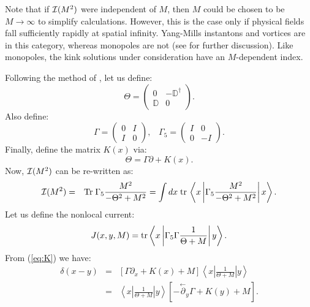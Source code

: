 \documentclass[a4paper,preprint,preprintnumbers,amsmath,amssymb]{revtex4}
\begin{document}
Note that if ${\cal I}(M^2)$ were independent of $M$, then $M$ could be chosen
to be $M \rightarrow \infty$ to simplify calculations. However, this is the 
case only if physical fields fall sufficiently rapidly at spatial infinity. 
Yang-Mills instantons and vortices are in this category, whereas
monopoles are not (see \cite[Appendix A]{ejw79} for further discussion).
Like monopoles, the kink solutions under consideration have an $M$-dependent 
index.

Following the method of \cite{ejw81}, let us define:
\begin{equation}
   \Theta = \left(\begin{array}{cc} 
             0              &  - \mathbb{D}^\dagger \\ 
             \mathbb{D}  &  0 
            \end{array}\right).
\end{equation}
%
Also define:
\begin{equation}
   \Gamma = \left(\begin{array}{cc}
       	     0  &  I \\
       	     I  &  0
            \end{array}\right),
   \;\;\; 
   \Gamma_5 = \left(\begin{array}{cc}
       	     I  &  0 \\
       	     0  &  -I 
            \end{array}\right).
\end{equation}
Finally, define the matrix $K(x)$ via:
\begin{equation}
  \Theta = \Gamma \partial + K(x).
   \label{eq:K}
\end{equation}
%
Now, ${\cal I}(M^2)$ can be re-written as:
\begin{eqnarray}
   {\cal I}(M^2) & = & \hbox{Tr} \; \Gamma_5 \frac{M^2}{-\Theta^2 + M^2}
   = \int dx \; \hbox{tr} \, \left\langle x \left| 
             \Gamma_5 \frac{M^2}{-\Theta^2 + M^2}
                           \right| x \right\rangle .
\end{eqnarray}
%
Let us define the nonlocal current:
\begin{equation}
   J(x,y,M)  =  \hbox{tr} \left\langle x \left| 
             \Gamma_5 \Gamma \frac{1}{\Theta + M}
       	       	       	   \right| y \right\rangle. 
\end{equation}
%
%
From (\ref{eq:K}) we have:
\begin{eqnarray}
  \delta(x-y) & = & [ \Gamma \partial_x + K(x) + M ] \left\langle x \left|  
             \frac{1}{\Theta + M} \right| y \right\rangle
               \nonumber \\
              & = & 
             \left\langle x \left| \frac{1}{\Theta + M} \right| y \right\rangle
           	[ - \overset{\leftarrow}{\partial}_y \Gamma + K(y) + M ].
\end{eqnarray}
\end{document}
